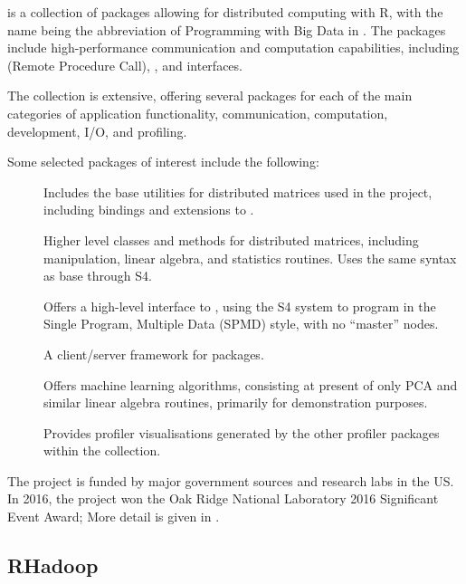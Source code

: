  is a collection of packages allowing for distributed computing with
R\cite{pbdBASEpackage}, with the name being the abbreviation of
Programming with Big Data in \R{}.
The packages include high-performance communication and computation capabilities, including  (Remote Procedure Call), , and  interfaces.

The collection is extensive, offering several packages for each of the main categories of application functionality, communication, computation, development, I/O, and profiling.

Some selected packages of interest include the following:

\begin{description}

	\item[] Includes the base utilities for distributed matrices used in the project, including bindings and extensions to \cite{pbdBASEpackage}.
	\item[]
		Higher level classes and methods for distributed matrices, including
		manipulation, linear algebra, and statistics routines.
		Uses the same syntax as base \R{} through S4\cite{pbdDMATpackage}.
	\item[]
		Offers a high-level interface to , using the S4 system to program in
		the Single Program, Multiple Data (SPMD) style, with no ``master'' nodes\cite{Chen2012pbdMPIpackage}.
	\item[]
		A client/server framework for 
		packages\cite{Schmidt2015pbdCSpackage}.
	\item[]
		Offers machine learning algorithms, consisting at present of only PCA
		and similar linear algebra routines, primarily for demonstration
		purposes\cite{schmidt20}.
	\item[]
		Provides profiler visualisations generated by the other profiler
		packages within the collection\cite{hpcvis}.
\end{description}

The project is funded by major government sources and research labs in the US.
In 2016, the project won the Oak Ridge National Laboratory 2016 Significant Event Award; More detail is given in \cite{pbdBASEvignette}.

\subsection{RHadoop}\label{subsec:rhadoop}

